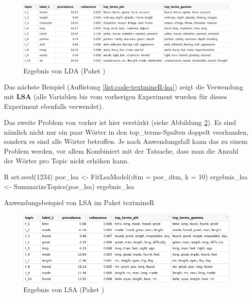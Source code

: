 \begin{figure}
    \centering
    \includegraphics[scale=0.45]{images/dlengsteiner/ergebnis_textmineR_lda_n.png}
    \caption{Ergebnis von LDA (Paket )}
    \label{fig:res-lda-textmineR}
\end{figure}

Das nächste Beispiel (Auflistung \ref{list:code-textmineR-lsa}) zeigt die Verwendung mit \textbf{LSA} (alle Variablen bis  vom vorherigen Experiment wurden für dieses Experiment ebenfalls verwendet). 

Das zweite Problem von vorher ist hier verstärkt (siehe Abbildung \ref{fig:res-lsa-textmineR}). Es sind nämlich nicht nur ein paar Wörter in den top\_terms-Spalten doppelt veorhanden, sondern es sind alle Wörter betroffen. Je nach Anwendungsfall kann das zu einem Problem werden, vor allem Kombiniert mit der Tatsache, dass man die Anzahl der Wörter pro Topic nicht erhöhen kann.

\begin{listing}
\begin{code}{R}
    set.seed(1234)
    poe_lsa <- FitLsaModel(dtm = poe_dtm, k = 10)
    ergebnis_lsa <- SummarizeTopics(poe_lsa)
    ergebnis_lsa
\end{code}  
    \caption{Anwendungsbeispiel von LSA im Paket textmineR}
    \label{list:code-textmineR-lsa}
\end{listing}

\begin{figure}
    \centering
    \includegraphics[scale=0.5]{images/dlengsteiner/ergebnis_textmineR_lsa.png}
    \caption{Ergebnis von LSA (Paket )}
    \label{fig:res-lsa-textmineR}
\end{figure}

